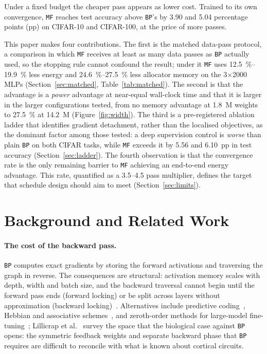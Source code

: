 \documentclass{llncs}
\newcommand{\MF}{\texttt{MF}}
\newcommand{\BP}{\texttt{BP}}
\begin{document}
Under a fixed budget the cheaper pass appears as lower cost. Trained to its
own convergence, \MF{} reaches test accuracy above \BP{}'s by
\num{3.90} and \num{5.04} percentage points (pp) on CIFAR-10 and CIFAR-100,
at the price of more passes.

This paper makes four contributions. The first is the matched data-pass
protocol, a comparison in which \MF{} receives at least as many data passes as \BP{}
actually used, so the stopping rule cannot confound the result; under it \MF{}
uses \SIrange{12.5}{19.9}{\percent} less energy and
\SIrange{24.6}{27.5}{\percent} less allocator memory on the
\num{3}$\times$\num{2000} MLPs (Section~\ref{sec:matched},
Table~\ref{tab:matched}). The second is that the advantage is
a \emph{power} advantage at near-equal wall-clock time and that it is larger in
the larger configurations tested, from no memory advantage at \num{1.8}~M
weights to \SI{27.5}{\percent} at \num{14.2}~M (Figure~\ref{fig:width}). The
third is a pre-registered ablation ladder that identifies gradient detachment,
rather than the localised objectives, as the dominant factor among those
tested: a deep supervision control is \emph{worse} than plain \BP{} on both
CIFAR tasks, while \MF{} exceeds it by \num{5.56} and \num{6.10}~pp in test
accuracy (Section~\ref{sec:ladder}). The fourth observation is
that the convergence rate is the only remaining barrier to \MF{} achieving an
end-to-end energy advantage. This rate, quantified as a
\SI{3.5}{\times}--\SI{4.5}{\times} pass multiplier, defines the target that
schedule design should aim to meet (Section~\ref{sec:limits}).


\section{Background and Related Work}
\label{sec:background}

\paragraph{The cost of the backward pass.}
\BP{} computes exact gradients by storing the forward activations and
traversing the graph in reverse. The consequences are structural: activation
memory scales with depth, width and batch size, and the backward traversal
cannot begin until the forward pass ends (forward locking) or be split across
layers without approximation (backward locking)~\cite{jaderberg2017decoupled}.
Alternatives include predictive coding~\cite{pinchetti2022predictive,salvatori2022brain},
Hebbian and associative schemes~\cite{journe2023hebbian,salvatori2022associative,salvatori2024stable},
and zeroth-order methods for large-model
fine-tuning~\cite{malladi2023fine}; Lillicrap et al.~\cite{lillicrap2020backpropagation}
survey the space that the biological case against \BP{} opens: the symmetric feedback weights and
separate backward phase that \BP{} requires are difficult to reconcile with
what is known about cortical circuits.
\end{document}

